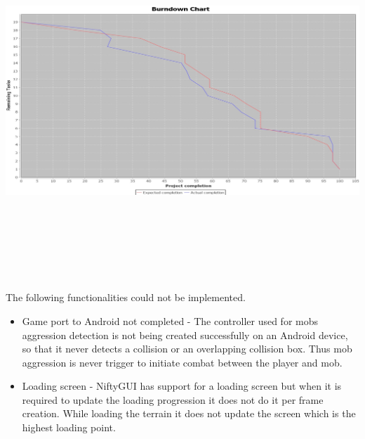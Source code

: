 \documentclass[letterpaper]{article}
\begin{document}
		\begin{minipage}{\textwidth}
			\begin{flushleft}
				\includegraphics[width=\textwidth,height=120mm]{UML_Diagram/Burndown_Chart.jpg}
			\end{flushleft}
		\end{minipage}
		
		\vspace{0.2in}
	\section*{\colorbox{black}{}} 
		\vspace{0.1in}
		
		The following functionalities could not be implemented.
		\begin{itemize}
			\item Game port to Android not completed - The controller used for mobs aggression detection is not being created successfully on an Android device, so that it never detects a collision or an overlapping collision box. Thus mob aggression is never trigger to initiate combat between the player and mob.
			\item Loading screen - NiftyGUI has support for a loading screen but when it is required to update the loading progression it does not do it per frame creation. While loading the terrain it does not update the screen which is the highest loading point. 
		\end{itemize}
		
\end{document}
